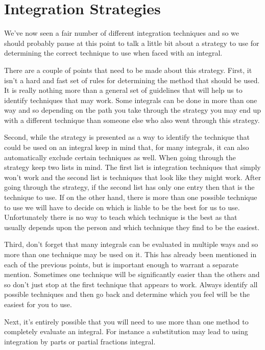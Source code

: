 \section{Integration Strategies}\label{sec:int_techniques}

We've now seen a fair number of different integration techniques and so we should probably pause at this point to talk a little bit about a strategy to use for determining the correct technique to use when faced with an integral.

There are a couple of points that need to be made about this strategy. First, it isn't a hard and fast set of rules for determining the method that should be used. It is really nothing more than a general set of guidelines that will help us to identify techniques that may work. Some integrals can be done in more than one way and so depending on the path you take through the strategy you may end up with a different technique than someone else who also went through this strategy.

Second, while the strategy is presented as a way to identify the technique that could be used on an integral keep in mind that, for many integrals, it can also automatically exclude certain techniques as well. When going through the strategy keep two lists in mind. The first list is integration techniques that simply won't work and the second list is techniques that look like they might work. After going through the strategy, if the second list has only one entry then that is the technique to use. If on the other hand, there is more than one possible technique to use we will have to decide on which is liable to be the best for us to use. Unfortunately there is no way to teach which technique is the best as that usually depends upon the person and which technique they find to be the easiest.

Third, don't forget that many integrals can be evaluated in multiple ways and so more than one technique may be used on it. This has already been mentioned in each of the previous points, but is important enough to warrant a separate mention. Sometimes one technique will be significantly easier than the others and so don't just stop at the first technique that appears to work. Always identify all possible techniques and then go back and determine which you feel will be the easiest for you to use.

Next, it's entirely possible that you will need to use more than one method to completely evaluate an integral. For instance a substitution may lead to using integration by parts or partial fractions integral.
\clearpage

